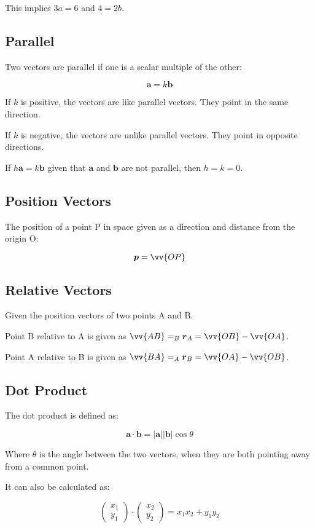 \documentclass[a4paper,11pt]{article}
\newcommand{\bb}{\boldsymbol}
\begin{document}
This implies $3a = 6$ and $4 = 2b$.


\subsection{Parallel}

Two vectors are parallel if one is a scalar multiple of the other:

$$
\bb{a} = k \bb{b}
$$

If $k$ is positive, the vectors are like parallel vectors. They point in the
same direction.

If $k$ is negative, the vectors are unlike parallel vectors. They point in
opposite directions.

If $h \bb{a} = k \bb{b}$ given that $\bb{a}$ and $\bb{b}$ are not parallel, then
$h = k = 0$.


\subsection{Position Vectors}

The position of a point P in space given as a direction and distance from the
origin O:

$$
\bb{p} = \vv{OP}
$$


\subsection{Relative Vectors}

Given the position vectors of two points A and B.

Point B relative to A is given as $\vv{AB} = _B\bb{r}_A = \vv{OB} - \vv{OA}$.

Point A relative to B is given as $\vv{BA} = _A\bb{r}_B = \vv{OA} - \vv{OB}$.


\subsection{Dot Product}

The dot product is defined as:

$$
\bb{a} \cdot \bb{b} = \lvert \bb{a} \rvert \lvert \bb{b} \rvert \cos{\theta}
$$

Where $\theta$ is the angle between the two vectors, when they are both pointing
away from a common point.

It can also be calculated as:

$$
\begin{pmatrix} x_1 \\ y_1 \end{pmatrix} \cdot \begin{pmatrix} x_2 \\ y_2 \end{pmatrix} = x_1 x_2 + y_1 y_2
$$
\end{document}
